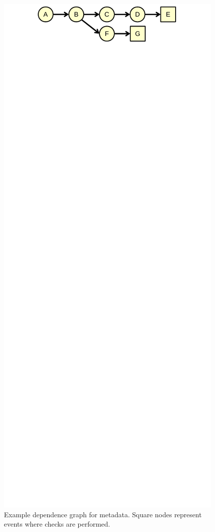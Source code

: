 \begin{figure}
  \begin{center}
    \includegraphics[width=\columnwidth]{figs/dataflow_graph.pdf}
    \vspace{-0.3in}
    \caption{Example dependence graph for metadata. Square nodes represent
    events where checks are performed.} 
    \label{fig:policies.dataflow_graph}
    \vspace{-0.1in}
  \end{center}
\end{figure}

